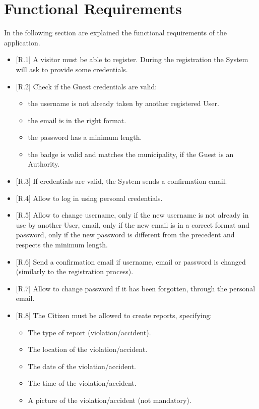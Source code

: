 \documentclass{report}
\begin{document}
\section{Functional Requirements}
In the following section are explained the functional requirements of the application.
\begin{itemize}
	\item {[R.1]} A visitor must be able to register. During the registration the System will ask to provide some credentials.
	\item {[R.2]} Check if the Guest credentials are valid:
		\begin{itemize}
			\item the username is not already taken by another registered User.
			\item the email is in the right format.
			\item the password has a minimum length.
			\item the badge is valid and matches the municipality, if the Guest is an Authority.
		\end{itemize}
	\item {[R.3]} If credentials are valid, the System sends a confirmation email.
	\item {[R.4]} Allow to log in using personal credentials.
	\item {[R.5]} Allow to change username, only if the new username is not already in use by another User, email, only if the
	new email is in a correct format and password, only if the new password is different from the precedent and respects the minimum length.
	\item {[R.6]} Send a confirmation email if username, email or password is changed (similarly to the registration process). 
	\item {[R.7]} Allow to change password if it has been forgotten, through the personal email.
	\item {[R.8]} The Citizen must be allowed to create reports, specifying:
		\begin{itemize}
			\item The type of report (violation/accident).
			\item The location of the violation/accident.
			\item The date of the violation/accident.
			\item The time of the violation/accident.
			\item A picture of the violation/accident (not mandatory).
		\end{itemize}

\end{itemize}
\end{document}
